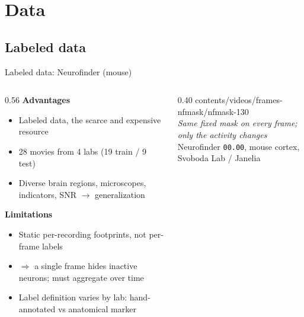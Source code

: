 \section{Data}
\subsection{Labeled data}

\begin{frame}[t]{Labeled data: Neurofinder (mouse)}
\begin{columns}[c]
\begin{column}{0.56\textwidth}
{\small\textbf{Advantages}}
{\small
\begin{itemize}\itemsep=0.25em
\item Labeled data, the scarce and expensive resource
\item 28 movies from 4 labs (19 train / 9 test)
\item Diverse brain regions, microscopes, indicators, SNR $\to$ generalization
\end{itemize}}
\medskip

{\small\textbf{Limitations}}
{\small
\begin{itemize}\itemsep=0.25em
\item Static per-recording footprints, not per-frame labels
\item $\Rightarrow$ a single frame hides inactive neurons; must aggregate over time
\item Label definition varies by lab: hand-annotated vs anatomical marker
\end{itemize}}
\end{column}
\hfill%
\begin{column}{0.40\textwidth}
\centering
{}%
{contents/videos/frames-nfmask/nfmask-}{1}{30}\\[0.3em]
{\small\itshape Same fixed mask on every frame; only the activity changes}\\[0.2em]
{\scriptsize Neurofinder \texttt{00.00}, mouse cortex, Svoboda Lab / Janelia
 \cite{peron2015barrel}}
\end{column}
\end{columns}
\end{frame}
